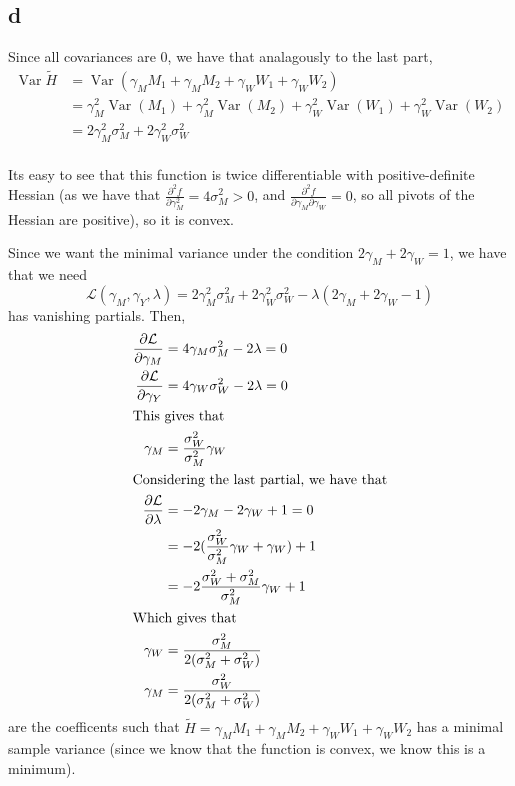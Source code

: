 \documentclass[12pt,letterpaper]{article}
\theoremstyle{definition}
\DeclareMathOperator{\Var}{Var}
\begin{document}
\subsection*{d}

Since all covariances are 0, we have that analagously to the last part,
\begin{align*}
  \Var{\widetilde{H}} &= \Var(\gamma_{M}M_{1} + \gamma_{M}M_{2} + \gamma_{W}W_{1} + \gamma_{W}W_{2}) \\
                     &= \gamma_{M}^{2}\Var(M_{1}) +  \gamma_{M}^{2}\Var(M_{2}) +  \gamma_{W}^{2}\Var(W_{1}) +  \gamma_{W}^{2}\Var(W_{2}) \\
                     &= 2\gamma_{M}^{2}\sigma_{M}^{2} + 2\gamma_{W}^{2}\sigma_{W}^{2} \\
\end{align*}

Its easy to see that this function is twice differentiable with positive-definite Hessian (as we have that $\frac{\partial^{2} f}{\partial \gamma_{M}^{2}} = 4\sigma_{M}^{2} > 0$, and $\frac{\partial^{2} f}{\partial \gamma_{M}\partial \gamma_{W}} = 0$, so all pivots of the Hessian are positive), so it is convex.

Since we want the minimal variance under the condition $2\gamma_{M} + 2\gamma_{W} = 1$, we have that we need
\[
  \mathcal{L}(\gamma_{M}, \gamma_{Y}, \lambda) = 2\gamma_{M}^{2}\sigma_{M}^{2} + 2\gamma_{W}^{2}\sigma_{W}^{2} - \lambda(2\gamma_{M} + 2\gamma_{W} - 1)
\]
has vanishing partials. Then,
\begin{align*}
  \frac{\partial \mathcal{L}}{\partial \gamma_{M}} & = 4\gamma_{M}\sigma_{M}^{2} - 2\lambda = 0        \\
  \frac{\partial \mathcal{L}}{\partial \gamma_{Y}} & = 4\gamma_{W}\sigma_{W}^{2} - 2\lambda = 0        \\
  \intertext{This gives that}
  \gamma_{M}                                       & = \frac{\sigma_{W}^{2}}{\sigma_{M}^{2}}\gamma_{W} \\
  \intertext{Considering the last partial, we have that}
  \frac{\partial \mathcal{L}}{\partial \lambda}    & = -2\gamma_{M} - 2\gamma_{W} + 1 = 0              \\
                                                   & = -2(\frac{\sigma_{W}^{2}}{\sigma_{M}^{2}}\gamma_{W} + \gamma_{W}) + 1 \\
                                                   & = -2\frac{\sigma_{W}^{2} + \sigma_{M}^{2}}{\sigma_{M}^{2}}\gamma_{W} + 1 \\
  \intertext{Which gives that}
  \gamma_{W} &= \frac{\sigma_{M}^{2}}{2(\sigma_{M}^{2} + \sigma_{W}^{2})} \\
  \gamma_{M} &= \frac{\sigma_{W}^{2}}{2(\sigma_{M}^{2} + \sigma_{W}^{2})} \\
\end{align*}
are the coefficents such that $\widetilde{H} = \gamma_{M}M_{1} + \gamma_{M}M_{2} + \gamma_{W}W_{1} + \gamma_{W}W_{2}$ has a minimal sample variance (since we know that the function is convex, we know this is a minimum).
\end{document}
